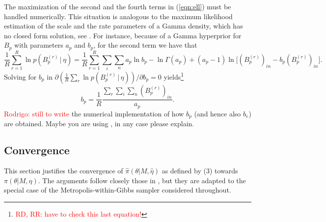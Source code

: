 \documentclass[11pt]{amsart}
\theoremstyle{definition}
\theoremstyle{remark}
\begin{document}
The maximization of the second and the fourth terms in (\ref{eqn:ell})
must be handled numerically. This situation is analogous to the
maximum likelihood estimation of the scale and the rate parameters of
a Gamma density, which has no closed form solution, see \cite{CW}. For
instance, because of a Gamma hyperprior for $B_p$ with parameters
$a_p$ and $b_p$, for the second term we have that
\[
   \frac{1}{R}\sum_{r=1}^R \ln p(B_p^{(r)}\,|\, \eta)
  =
   \frac{1}{R}\sum_{r=1}^R \sum_{i}\sum_{n} a_p\ln b_p  
    - \ln\Gamma(a_p) + 
  (a_p-1)\ln\big[(B_p^{(r)})_{in} - b_p(B_p^{(r)})_{in}\big].
\]
Solving for $b_p$ in $\partial(\frac{1}{R}\sum_r \ln p(B_p^{(r)}\,|\,
\eta))/\partial b_p = 0$  yields\footnote{\textcolor{red}{RD, RR: have
    to check this last equation!}}
\[
   b_p =\frac{1}{R} \frac{\sum_r\sum_i\sum_n (B_p^{(r)})_{in}}{a_p}.
\] 
\textcolor{red}{Rodrigo: still to write} the numerical implementation
of how $b_p$ (and hence also $b_e$) are obtained. Maybe you are using
\cite{J}, in any case please explain.


\subsection{Convergence}
This section justifies the convergence of $\hat\pi(\theta|M,
\hat\eta)$ as defined by (3) towards $\pi(\theta|M, \eta)$. The
arguments follow closely those in \cite{C01}, but they are adapted to
the special case of the Metropolis-within-Gibbs sampler considered
throughout. 
\end{document}
